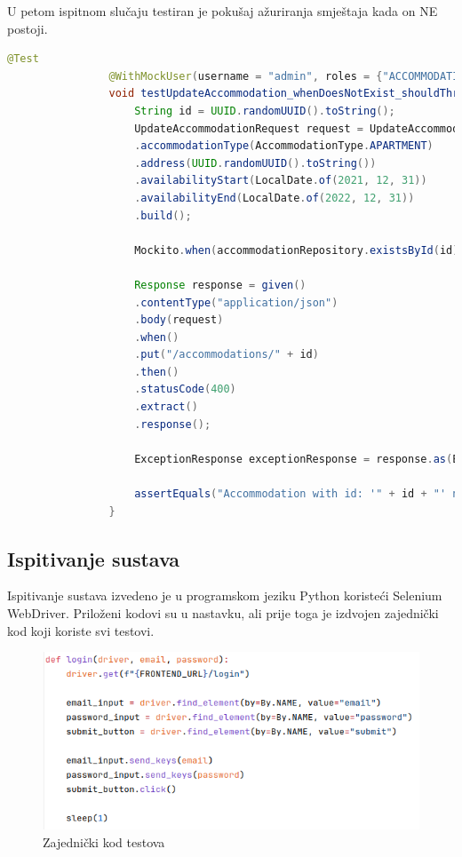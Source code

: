 			U petom ispitnom slučaju testiran je pokušaj ažuriranja smještaja kada on NE postoji.
			
			\begin{lstlisting}[language=Java]
				@Test
				@WithMockUser(username = "admin", roles = {"ACCOMMODATION", "TRANSPORT", "PATIENT"})
				void testUpdateAccommodation_whenDoesNotExist_shouldThrow() {
					String id = UUID.randomUUID().toString();
					UpdateAccommodationRequest request = UpdateAccommodationRequest.builder()
					.accommodationType(AccommodationType.APARTMENT)
					.address(UUID.randomUUID().toString())
					.availabilityStart(LocalDate.of(2021, 12, 31))
					.availabilityEnd(LocalDate.of(2022, 12, 31))
					.build();
					
					Mockito.when(accommodationRepository.existsById(id)).thenReturn(false);
					
					Response response = given()
					.contentType("application/json")
					.body(request)
					.when()
					.put("/accommodations/" + id)
					.then()
					.statusCode(400)
					.extract()
					.response();
					
					ExceptionResponse exceptionResponse = response.as(ExceptionResponse.class);
					
					assertEquals("Accommodation with id: '" + id + "' not found!", exceptionResponse.getMessage());
				}
			\end{lstlisting}
			
			
			
			
			\subsection{Ispitivanje sustava}
			
			Ispitivanje sustava izvedeno je u programskom jeziku Python koristeći Selenium WebDriver. Priloženi kodovi su u nastavku, ali prije toga je izdvojen zajednički kod koji koriste svi testovi.
			
			\begin{figure}[H]
				\includegraphics[width=\textwidth]{slike/selenium_common.png}
				\centering
				\caption{Zajednički kod testova}
				\label{fig:zajednicki-kod-testova}
			\end{figure}
			
